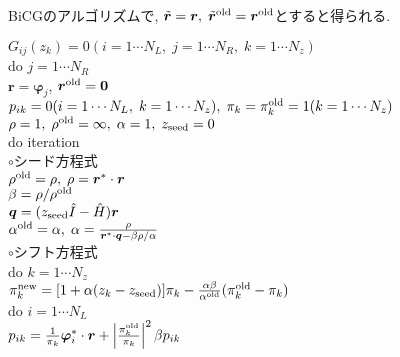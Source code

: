 \documentclass[12pt,titlepage]{jarticle}
\begin{document}
BiCGのアルゴリズムで, ${\tilde {\boldsymbol r}} = {\boldsymbol r},\; 
{\tilde {\boldsymbol r}}^{\rm old} = {\boldsymbol r}^{\rm old}$とすると得られる.

\noindent
$G_{i j}(z_k) = 0 (i=1 \cdots N_L,\; j = 1 \cdots N_R,\; k=1 \cdots N_z)$
\\
do $j = 1 \cdots N_R$
\\\hspace{0.5cm}
${\boldsymbol r} = {\boldsymbol \varphi_j}$, 
${\boldsymbol r}^{\rm old} = {\bf 0}$
\\\hspace{0.5cm}
$p_{i k} = 0(i=1 \cdots N_L,\; k=1 \cdots N_z),\; \pi_k=\pi_k^{\rm old} = 1(k=1 \cdots N_z)$ 
\\\hspace{0.5cm}
$\rho = 1,\; \rho^{\rm old} = \infty,\; \alpha = 1,\; z_{\rm seed}=0$ 
\\\hspace{0.5cm}
do iteration
\\\hspace{1.0cm}
$\circ$シード方程式
\\\hspace{1.0cm}
$\rho^{\rm old} = \rho,\; \rho = {\boldsymbol r}^* \cdot {\boldsymbol r}$
\\\hspace{1.0cm}
$\beta = \rho / \rho^{\rm old}$
\\\hspace{1.0cm}
${\boldsymbol q} = (z_{\rm seed} {\hat I} - {\hat H}){\boldsymbol r}$
\\\hspace{1.0cm}
$\alpha^{\rm old} = \alpha,\; 
\alpha = \frac{\rho}{{\boldsymbol r}^* \cdot {\boldsymbol q} - \beta \rho / \alpha }$
\\\hspace{1.0cm}
$\circ$シフト方程式
\\\hspace{1.0cm}
do $k = 1 \cdots N_z$
\\\hspace{1.5cm}
$\pi_k^{\rm new} = [1+\alpha(z_k-z_{\rm seed})]\pi_k - \frac{\alpha \beta}{\alpha^{\rm old}}(\pi_k^{\rm old} - \pi_k)$
\\\hspace{1.5cm}
do $i = 1 \cdots N_L$
\\\hspace{2.0cm}
$p_{i k} = \frac{1}{\pi_k} {\boldsymbol \varphi}_i^* \cdot {\boldsymbol r} + 
\left|\frac{\pi^{\rm old}_k}{\pi_k } \right|^2 \beta p_{i k}$
\\\hspace{2.0cm}
\end{document}
